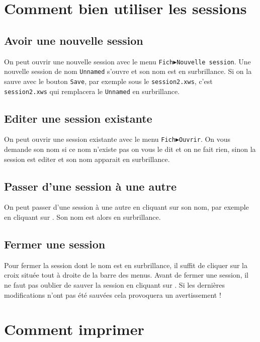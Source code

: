 \documentclass[a4paper,11pt]{article}
\begin{document}
\section{Comment bien utiliser les sessions}
\subsection{Avoir une nouvelle session}
On peut ouvrir une nouvelle session avec le menu
{\tt Fich$\blacktriangleright$Nouvelle session}. Une nouvelle session de nom 
{\tt Unnamed} s'ouvre et son nom est en surbrillance. Si on la sauve avec le 
bouton {\tt Save}, par exemple sous le {\tt session2.xws}, c'est 
{\tt session2.xws} qui remplacera le {\tt Unnamed} en surbrillance.
\subsection{Editer une session existante}
On peut ouvrir une  session existante avec le menu
{\tt Fich$\blacktriangleright$Ouvrir}. On vous demande son nom si ce nom n'existe pas on vous le dit et on ne fait rien, sinon la session est editer et son nom
apparait  en surbrillance.
\subsection{Passer d'une session \`a une autre}
On peut passer d'une session \`a une autre  en cliquant sur son nom,
 par exemple  en cliquant sur . Son nom
est alors en surbrillance.
\subsection{Fermer une session} 
Pour fermer la session dont le nom est en surbrillance, il suffit de cliquer 
sur la croix situ\'ee tout \`a droite de la barre des menus. Avant de fermer 
une session, il ne faut pas oublier de sauver la session en cliquant sur 
. Si les derni\`eres modifications n'ont pas \'et\'e 
sauv\'ees cela provoquera un avertissement ! 

\section{Comment  imprimer}
\end{document}

